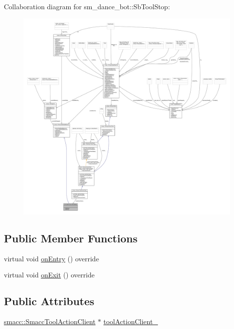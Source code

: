 Collaboration diagram for sm\+\_\+dance\+\_\+bot\+:\+:Sb\+Tool\+Stop\+:
\nopagebreak
\begin{figure}[H]
\begin{center}
\leavevmode
\includegraphics[width=350pt]{classsm__dance__bot_1_1SbToolStop__coll__graph}
\end{center}
\end{figure}
\subsection*{Public Member Functions}
\begin{DoxyCompactItemize}
\item 
virtual void \hyperlink{classsm__dance__bot_1_1SbToolStop_a9cc35f49b86e6d418a4f7637182e7e8f}{on\+Entry} () override
\item 
virtual void \hyperlink{classsm__dance__bot_1_1SbToolStop_a1bcdd7b95398f6805a333f35c5870c07}{on\+Exit} () override
\end{DoxyCompactItemize}
\subsection*{Public Attributes}
\begin{DoxyCompactItemize}
\item 
\hyperlink{classsmacc_1_1SmaccToolActionClient}{smacc\+::\+Smacc\+Tool\+Action\+Client} $\ast$ \hyperlink{classsm__dance__bot_1_1SbToolStop_a1f19d8fec8a4c7d92034b53e4334c180}{tool\+Action\+Client\+\_\+}
\end{DoxyCompactItemize}


